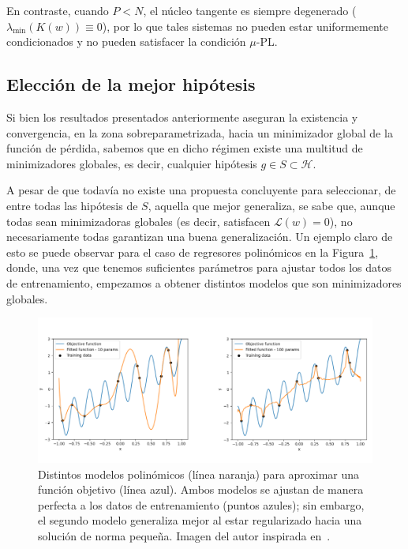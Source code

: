 En contraste, cuando $P < N$, el núcleo tangente es siempre degenerado ($\lambda_{\min}(K(w)) \equiv 0$), por lo que tales sistemas no pueden estar uniformemente condicionados y no pueden satisfacer la condición $\mu$-PL.\newline

\subsection{Elección de la mejor hipótesis}\label{subsec:suavidad-funcional}

Si bien los resultados presentados anteriormente aseguran la existencia y convergencia, en la zona sobreparametrizada, hacia un minimizador global de la función de pérdida, sabemos que en dicho régimen existe una multitud de minimizadores globales, es decir, cualquier hipótesis $g \in S \subset \mathcal{H}$.\newline  

A pesar de que todavía no existe una propuesta concluyente para seleccionar, de entre todas las hipótesis de $S$, aquella que mejor generaliza, se sabe que, aunque todas sean minimizadoras globales (es decir, satisfacen $\mathcal{L}(w) = 0$), no necesariamente todas garantizan una buena generalización. Un ejemplo claro de esto se puede observar para el caso de regresores polinómicos en la Figura~\ref{fig:suavidad1}, donde, una vez que tenemos suficientes parámetros para ajustar todos los datos de entrenamiento, empezamos a obtener distintos modelos que son minimizadores globales.\newline

\begin{figure}[h]
    \centering
    \includegraphics[width=0.8\linewidth]{img/suavidad1.png}
    \caption[Distintos modelos polinómicos para aproximar una función.]{Distintos modelos polinómicos (línea naranja) para aproximar una función objetivo (línea azul). Ambos modelos se ajustan de manera perfecta a los datos de entrenamiento (puntos azules); sin embargo, el segundo modelo generaliza mejor al estar regularizado hacia una solución de norma pequeña. Imagen del autor inspirada en~\cite{Schaeffer2023}.}\label{fig:suavidad1}
\end{figure}

